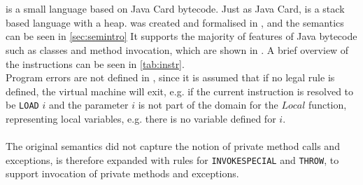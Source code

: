 \section{\jcl}
\jcl is a small language based on Java Card bytecode. Just as Java Card, \jcl is a stack based language with a heap. \jcl was created and formalised in \cite{javasec}, and the semantics can be seen in \cref{sec:semintro}
It supports the majority of features of Java bytecode such as classes and method invocation, which are shown in . 
A brief overview of the instructions can be seen in \cref{tab:instr}.\\

\noindent Program errors are not defined in \jcl, since it is assumed that if no legal rule is defined, the virtual machine will exit, e.g. if the current instruction is resolved to be \texttt{LOAD} $i$ and the parameter $i$ is not part of the domain for the $Local$ function, representing local variables, e.g. there is no variable defined for $i$.\\\\
The original semantics did not capture the notion of private method calls and exceptions, \jcl is therefore expanded with rules for \texttt{INVOKESPECIAL} and \texttt{THROW}, to support invocation of private methods and exceptions.
